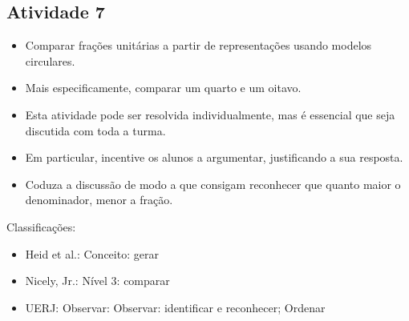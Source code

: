 \documentclass[oneside]{book}
\begin{document}
\begin{multicols}{2}
\subsection{Atividade 7}

  \vspace{.1cm}
  
\begin{itemize} %
    \item       Comparar frações unitárias a partir de representações usando modelos circulares.
    \item       Mais especificamente, comparar um quarto e um oitavo.
\end{itemize} %


  \vspace{.1cm} 
  
  \vspace{.1cm}
  
\begin{itemize} %
    \item       Esta atividade pode ser resolvida individualmente, mas é essencial que seja discutida com toda a turma.
    \item       Em particular, incentive os alunos a argumentar, justificando a sua resposta.
    \item       Coduza a discussão de modo a que consigam reconhecer que quanto maior o denominador, menor a fração.
\end{itemize} %


  Classificações:
\begin{itemize} %
    \item       Heid et al.: Conceito: gerar
    \item       Nicely, Jr.: Nível 3: comparar
    \item       UERJ: Observar: Observar: identificar e reconhecer; Ordenar
\end{itemize} %




\end{multicols}
\end{document}
